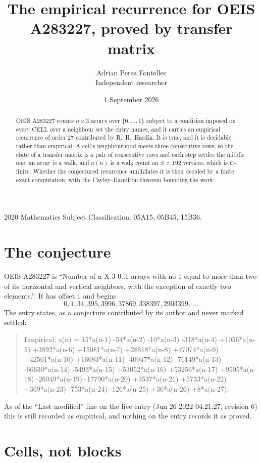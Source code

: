 \documentclass[11pt,a4paper]{article}
\title{The empirical recurrence for OEIS A283227, proved by transfer matrix}
\author{Adrian Perez Fontelles\\ \small Independent researcher}
\date{1 September 2026}
\theoremstyle{plain}
\theoremstyle{definition}
\begin{document}
\maketitle

\begin{abstract}
OEIS A283227 counts $n\times3$ arrays over $\{0,\dots,1\}$ subject to a condition imposed on
every CELL over a neighbour set the entry names, and it carries an empirical recurrence of
order $27$ contributed by R.~H.~Hardin. It is true, and it is decidable rather than
empirical. A cell's neighbourhood meets three consecutive rows, so the state of a transfer
matrix is a pair of consecutive rows and each step settles the middle one; an array is a
walk, and $a(n)$ is a walk count on $S=192$ vertices, which is $C$-finite. Whether the
conjectured recurrence annihilates it is then decided by a finite exact computation, with the
Cayley--Hamilton theorem bounding the work.
\end{abstract}

\noindent\small 2020 Mathematics Subject Classification. 05A15, 05B45, 15B36.\normalsize

\section{The conjecture}

OEIS A283227 is ``Number of n X 3 0..1 arrays with no 1 equal to more than two of its horizontal and vertical neighbors, with the exception of exactly two elements.''. It has offset $1$ and begins
\[
0, 1, 34, 395, 3996, 37869, 338397, 2903399,\ \dots
\]
The entry states, as a conjecture contributed by its author and never marked settled:
\begin{quote}
Empirical: a(n) = 15*a(n-1) -54*a(n-2) -10*a(n-3) -318*a(n-4) +1056*a(n-5) +3892*a(n-6) +15081*a(n-7) +28818*a(n-8) +47074*a(n-9) +42561*a(n-10) +16083*a(n-11) -40047*a(n-12) -76149*a(n-13) -66630*a(n-14) -5493*a(n-15) +53052*a(n-16) +53256*a(n-17) +9505*a(n-18) -26049*a(n-19) -17790*a(n-20) +3537*a(n-21) +5733*a(n-22) +369*a(n-23) -753*a(n-24) -126*a(n-25) +36*a(n-26) +8*a(n-27).
\end{quote}
As of the ``Last modified'' line on the live entry (Jun 26 2022 04:21:27, revision 6) this is still
recorded as empirical, and nothing on the entry records it as proved.

\section{Cells, not blocks}
\end{document}
